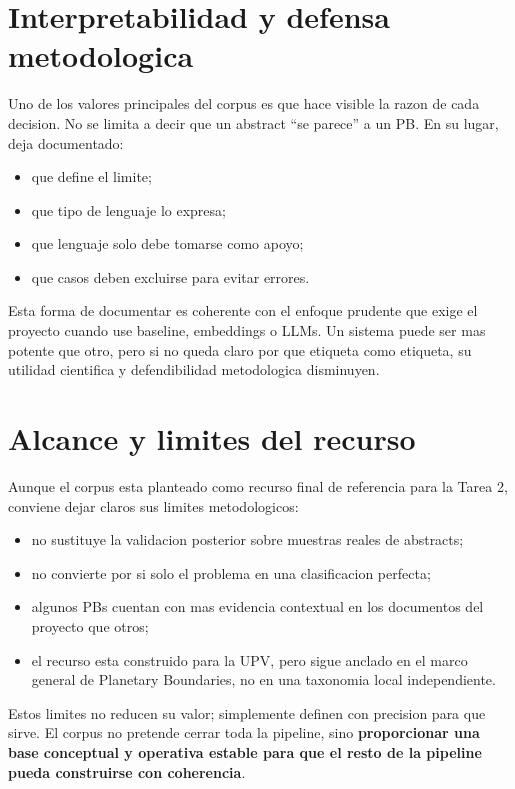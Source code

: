 \documentclass[11pt,a4paper]{article}
\begin{document}
\section{Interpretabilidad y defensa metodologica}

Uno de los valores principales del corpus es que hace visible la razon de cada decision. No se limita a decir que un abstract ``se parece'' a un PB. En su lugar, deja documentado:

\begin{itemize}
\item que define el limite;
\item que tipo de lenguaje lo expresa;
\item que lenguaje solo debe tomarse como apoyo;
\item que casos deben excluirse para evitar errores.
\end{itemize}

Esta forma de documentar es coherente con el enfoque prudente que exige el proyecto cuando use baseline, embeddings o LLMs. Un sistema puede ser mas potente que otro, pero si no queda claro por que etiqueta como etiqueta, su utilidad cientifica y defendibilidad metodologica disminuyen.

\section{Alcance y limites del recurso}

Aunque el corpus esta planteado como recurso final de referencia para la Tarea 2, conviene dejar claros sus limites metodologicos:

\begin{itemize}
\item no sustituye la validacion posterior sobre muestras reales de abstracts;
\item no convierte por si solo el problema en una clasificacion perfecta;
\item algunos PBs cuentan con mas evidencia contextual en los documentos del proyecto que otros;
\item el recurso esta construido para la UPV, pero sigue anclado en el marco general de Planetary Boundaries, no en una taxonomia local independiente.
\end{itemize}

Estos limites no reducen su valor; simplemente definen con precision para que sirve. El corpus no pretende cerrar toda la pipeline, sino \textbf{proporcionar una base conceptual y operativa estable para que el resto de la pipeline pueda construirse con coherencia}.
\end{document}
